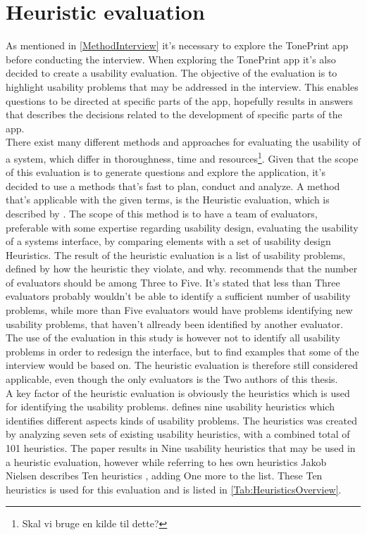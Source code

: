 \section{Heuristic evaluation}
\label{SectionHeuristicEvaluation}
As mentioned in \autoref{MethodInterview} it's necessary to explore the TonePrint app before conducting the interview. When exploring the TonePrint app it's also decided to create a usability evaluation. The objective of the evaluation is to highlight usability problems that may be addressed in the interview. This enables questions to be directed at specific parts of the app, hopefully results in answers that describes the decisions related to the development of specific parts of the app. \\
There exist many different methods and approaches for evaluating the usability of a system, which differ in thoroughness, time and resources\footnote{Skal vi bruge en kilde til dette?}. Given that the scope of this evaluation is to generate questions and explore the application, it's decided to use a methods that's fast to plan, conduct and analyze. A method that's applicable with the given terms, is the Heuristic evaluation, which is described by \parencite{WEB:Nielsen1994HowTo}. The scope of this method is to have a team of evaluators, preferable with some expertise regarding usability design, evaluating the usability of a systems interface, by comparing elements with a set of usability design Heuristics. The result of the heuristic evaluation is a list of usability problems, defined by how the heuristic they violate, and why. \textcite{WEB:Nielsen1994HowTo} recommends that the number of evaluators should be among Three to Five. It's stated that less than Three evaluators probably wouldn't be able to identify a sufficient number of usability problems, while more than Five evaluators would have problems identifying new usability problems, that haven't allready been identified by another evaluator. The use of the evaluation in this study is however not to identify all usability problems in order to redesign the interface, but to find examples that some of the interview would be based on. The heuristic evaluation is therefore still considered applicable, even though the only evaluators is the Two authors of this thesis.\\ 
A key factor of the heuristic evaluation is obviously the heuristics which is used for identifying the usability problems. \textcite{WEB:Nielsen1994} defines nine usability heuristics which identifies different aspects kinds of usability problems. The heuristics was created by analyzing seven sets of existing usability heuristics, with a combined total of 101 heuristics. The paper results in Nine usability heuristics that may be used in a heuristic evaluation, however while referring to hes own heuristics \parencite{WEB:Nielsen1994} Jakob Nielsen describes Ten heuristics \parencite{WEB:Nielsen1994Ten,WEB:Nielsen1994HowTo}, adding One more to the list. These Ten heuristics is used for this evaluation and is listed in \autoref{Tab:HeuristicsOverview}.

